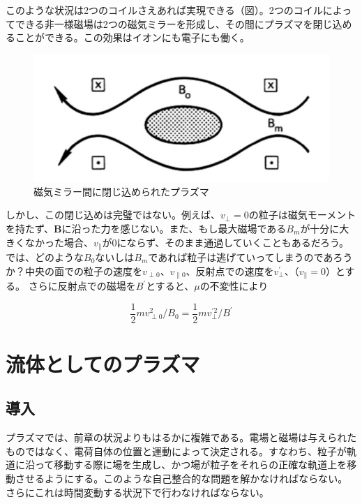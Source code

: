 \documentclass{ltjsarticle}
\numberwithin{equation}{section} %
\begin{document}
このような状況は2つのコイルさえあれば実現できる（図）。2つのコイルによってできる非一様磁場は2つの磁気ミラーを形成し、その間にプラズマを閉じ込めることができる。この効果はイオンにも電子にも働く。

\begin{figure}[htbp]
  \centering
  \includegraphics[width=0.7\linewidth]{trapped.png}
  \caption{磁気ミラー間に閉じ込められたプラズマ}
  \label{fig.trap}
\end{figure}

しかし、この閉じ込めは完璧ではない。例えば、$v_\perp=0$の粒子は磁気モーメントを持たず、$\bm{B}$に沿った力を感じない。また、もし最大磁場である$B_m$が十分に大きくなかった場合、$v_\parallel$が0にならず、そのまま通過していくこともあるだろう。
では、どのような$B_0$ないしは$B_m$であれば粒子は逃げていってしまうのであろうか？中央の面での粒子の速度を$v_{\perp 0}$、$v_{\parallel 0}$、反射点での速度を$v_\perp ^\prime$、（$v_\parallel =0$）とする。
さらに反射点での磁場を$B^\prime$とすると、$\mu$の不変性により

\begin{equation}
  \frac{1}{2}mv_{\perp 0} ^2 /B_0 = \frac{1}{2}mv_\perp ^{\prime 2}/B^\prime
\end{equation}











\section{流体としてのプラズマ}
\subsection{導入}
プラズマでは、前章の状況よりもはるかに複雑である。電場と磁場は与えられたものではなく、電荷自体の位置と運動によって決定される。すなわち、粒子が軌道に沿って移動する際に場を生成し、かつ場が粒子をそれらの正確な軌道上を移動させるようにする。このような自己整合的な問題を解かなければならない。さらにこれは時間変動する状況下で行わなければならない。
\end{document}
